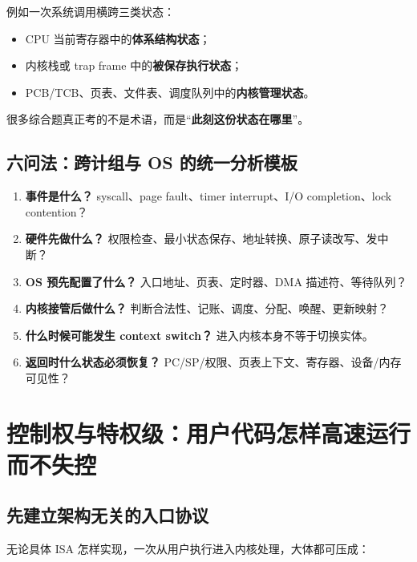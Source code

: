 \documentclass[11pt,a4paper]{ctexart}
\newcommand{\kw}[1]{\textbf{#1}}
\begin{document}
\begin{bridge}
例如一次系统调用横跨三类状态：
\begin{itemize}
  \item CPU 当前寄存器中的\kw{体系结构状态}；
  \item 内核栈或 trap frame 中的\kw{被保存执行状态}；
  \item PCB/TCB、页表、文件表、调度队列中的\kw{内核管理状态}。
\end{itemize}
很多综合题真正考的不是术语，而是“\kw{此刻这份状态在哪里}”。
\end{bridge}

\subsection{六问法：跨计组与 OS 的统一分析模板}
\begin{method}
\begin{enumerate}
  \item \kw{事件是什么？} syscall、page fault、timer interrupt、I/O completion、lock contention？
  \item \kw{硬件先做什么？} 权限检查、最小状态保存、地址转换、原子读改写、发中断？
  \item \kw{OS 预先配置了什么？} 入口地址、页表、定时器、DMA 描述符、等待队列？
  \item \kw{内核接管后做什么？} 判断合法性、记账、调度、分配、唤醒、更新映射？
  \item \kw{什么时候可能发生 context switch？} 进入内核本身不等于切换实体。
  \item \kw{返回时什么状态必须恢复？} PC/SP/权限、页表上下文、寄存器、设备/内存可见性？
\end{enumerate}
\end{method}

\section{控制权与特权级：用户代码怎样高速运行而不失控}

\subsection{先建立架构无关的入口协议}
无论具体 ISA 怎样实现，一次从用户执行进入内核处理，大体都可压成：
\end{document}
